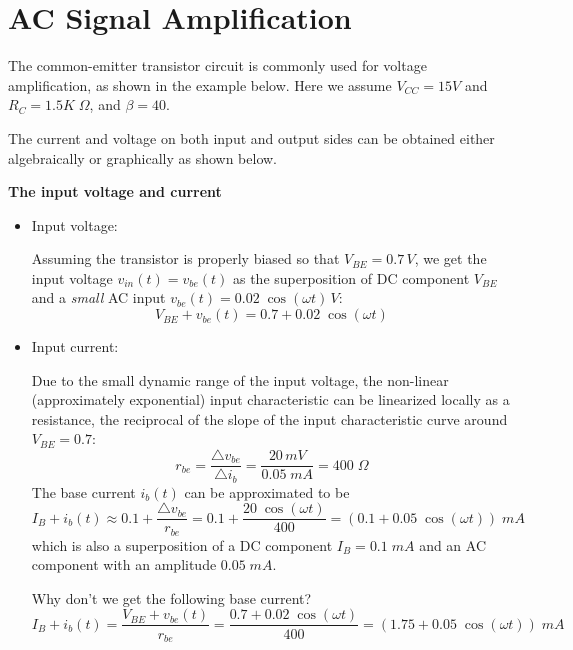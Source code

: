 


\section*{AC Signal Amplification}

The common-emitter transistor circuit is commonly used for voltage
amplification, as shown in the example below. Here we assume $V_{CC}=15V$
and $R_C=1.5K\;\Omega$, and $\beta=40$. 


The current and voltage on both input and output sides can be 
obtained either algebraically or graphically as shown below.

{\bf The input voltage and current}

\begin{itemize}



\item Input voltage:

  Assuming the transistor is properly biased so that $V_{BE}=0.7\,V$, 
  we get the input voltage $v_{in}(t)=v_{be}(t)$ as the superposition 
  of DC component $V_{BE}$ and a {\em small} AC input 
  $v_{be}(t)=0.02\;\cos(\omega t)\,V$:
  \[
  V_{BE}+v_{be}(t)=0.7+0.02\;\cos(\omega t)
  \]
\item Input current:
  
  Due to the small dynamic range of the input voltage, the non-linear 
  (approximately exponential) input characteristic can be linearized
  locally as a resistance, the reciprocal of the slope of the input 
  characteristic curve around $V_{BE}=0.7$:
  \[
  r_{be}=\frac{\triangle v_{be}}{\triangle i_b}=\frac{20\,mV}{0.05\;mA}=400 \;\Omega
  \]
  The base current $i_b(t)$ can be approximated to be 
  \[ 
  I_B+i_b(t) \approx 0.1+\frac{\triangle v_{be}}{r_{be}}
  =0.1+\frac{20\;\cos(\omega t)}{400}
  =(0.1+0.05\;\cos(\omega t))\;mA 
  \]
  which is also a superposition of a DC component $I_B=0.1\;mA$ and 
  an AC component with an amplitude $0.05\;mA$. 

  Why don't we get the following base current?
  \[
  I_B+i_b(t) =\frac{V_{BE}+v_{be}(t)}{r_{be}}
  =\frac{0.7+0.02\;\cos(\omega t)}{400}
  =(1.75+0.05\;\cos(\omega t))\;mA 
  \]

\end{itemize}

